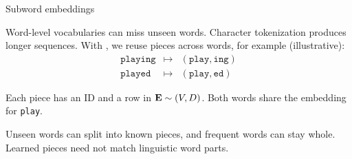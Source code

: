 \begin{frame}{Subword embeddings}
    \setlength{\parskip}{3pt}
    \setlength{\abovedisplayskip}{6pt}
    \setlength{\belowdisplayskip}{6pt}

    Word-level vocabularies can miss unseen words. Character tokenization
    produces longer sequences. With , we reuse
    pieces across words, for example (illustrative):
    \[
        \begin{array}{rcl}
            \texttt{playing} & \longmapsto & (\texttt{play},\texttt{ing}) \\
            \texttt{played}  & \longmapsto & (\texttt{play},\texttt{ed})
        \end{array}
    \]

    Each piece has an ID and a row in $\boldsymbol{\mathbf{E}}\sim(V,D)$.
    Both words share the embedding for \texttt{play}.

    Unseen words can split into known pieces, and frequent words can stay whole.
    Learned pieces need not match linguistic word parts.


\end{frame}

